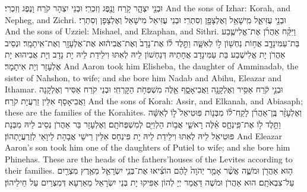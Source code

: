 {%
{וּבְנֵ֖י יִצְהָ֑ר קֹ֥רַח וָנֶ֖פֶג וְזִכְרִֽי׃}
{וּבְנֵי יִצְהָר קֹרַח וָנֶפֶג וְזִכְרִי׃}
{And the sons of Izhar: Korah, and Nepheg, and Zichri.}{}
{וּבְנֵ֖י עֻזִּיאֵ֑ל מִֽישָׁאֵ֥ל וְאֶלְצָפָ֖ן וְסִתְרִֽי׃}
{וּבְנֵי עֻזִּיאֵל מִישָׁאֵל וְאֶלְצָפָן וְסִתְרִי׃}
{And the sons of Uzziel: Mishael, and Elzaphan, and Sithri.}{}
{וַיִּקַּ֨ח אַהֲרֹ֜ן אֶת־אֱלִישֶׁ֧בַע בַּת־עַמִּינָדָ֛ב אֲח֥וֹת נַחְשׁ֖וֹן ל֣וֹ לְאִשָּׁ֑ה וַתֵּ֣לֶד ל֗וֹ אֶת־נָדָב֙ וְאֶת־אֲבִיה֔וּא אֶת־אֶלְעָזָ֖ר וְאֶת־אִֽיתָמָֽר׃
}
{וּנְסֵיב אַהֲרֹן יָת אֱלִישֶׁבַע בַּת עַמִּינָדָב אֲחָתֵיהּ דְּנַחְשׁוֹן לֵיהּ לְאִתּוּ וִילֵידַת לֵיהּ יָת נָדָב וְיָת אֲבִיהוּא יָת אֶלְעָזָר וְיָת אִיתָמָר׃}
{And Aaron took him Elisheba, the daughter of Amminadab, the sister of Nahshon, to wife; and she bore him Nadab and Abihu, Eleazar and Ithamar.}{}
{וּבְנֵ֣י קֹ֔רַח אַסִּ֥יר וְאֶלְקָנָ֖ה וַאֲבִיאָסָ֑ף אֵ֖לֶּה מִשְׁפְּחֹ֥ת הַקׇּרְחִֽי׃}
{וּבְנֵי קֹרַח אַסִּיר וְאֶלְקָנָה וַאֲבִיאָסָף אִלֵּין זַרְעֲיָת קֹרַח׃}
{And the sons of Korah: Assir, and Elkanah, and Abiasaph; these are the families of the Korahites.}{}
{וְאֶלְעָזָ֨ר בֶּֽן־אַהֲרֹ֜ן לָקַֽח־ל֨וֹ מִבְּנ֤וֹת פּֽוּטִיאֵל֙ ל֣וֹ לְאִשָּׁ֔ה וַתֵּ֥לֶד ל֖וֹ אֶת־פִּֽינְחָ֑ס אֵ֗לֶּה רָאשֵׁ֛י אֲב֥וֹת הַלְוִיִּ֖ם לְמִשְׁפְּחֹתָֽם׃
}
{וְאֶלְעָזָר בַּר אַהֲרֹן נְסֵיב לֵיהּ מִבְּנָת פּוּטִיאֵל לֵיהּ לְאִתּוּ וִילֵידַת לֵיהּ יָת פִּינְחָס אִלֵּין רֵישֵׁי אֲבָהָת לֵיוָאֵי לְזַרְעֲיָתְהוֹן׃}
{And Eleazar Aaron’s son took him one of the daughters of Putiel to wife; and she bore him Phinehas. These are the heads of the fathers’houses of the Levites according to their families.}{}
{ה֥וּא אַהֲרֹ֖ן וּמֹשֶׁ֑ה אֲשֶׁ֨ר אָמַ֤ר יְהֹוָה֙ לָהֶ֔ם הוֹצִ֜יאוּ אֶת־בְּנֵ֧י יִשְׂרָאֵ֛ל מֵאֶ֥רֶץ מִצְרַ֖יִם עַל־צִבְאֹתָֽם׃
}
{הוּא אַהֲרֹן וּמֹשֶׁה דַּאֲמַר יְיָ לְהוֹן אַפִּיקוּ יָת בְּנֵי יִשְׂרָאֵל מֵאַרְעָא דְּמִצְרַיִם עַל חֵילֵיהוֹן׃}
}
